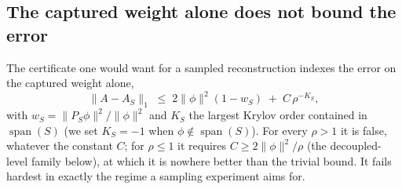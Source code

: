 %

\subsection{The captured weight alone does not bound the error}
\label{sec:retraction}

The certificate one would want for a sampled reconstruction indexes the error on the captured
weight alone,
\begin{equation}
\lVert A-A_S\rVert_{1}\;\le\;2\lVert\phi\rVert^{2}(1-w_S)\;+\;C\,\rho^{-K_S},
\label{eq:weightonly}
\end{equation}
with $w_S=\lVert P_S\phi\rVert^{2}/\lVert\phi\rVert^{2}$ and $K_S$ the largest Krylov order
contained in $\operatorname{span}(S)$ (we set $K_S=-1$ when $\phi\notin\operatorname{span}(S)$).
For every $\rho>1$ it is false, whatever the constant $C$; for $\rho\le1$ it requires
$C\ge2\lVert\phi\rVert^{2}/\rho$ (the decoupled-level family below), at which it is nowhere better
than the trivial bound.
It fails hardest in exactly the regime a sampling experiment aims for.

